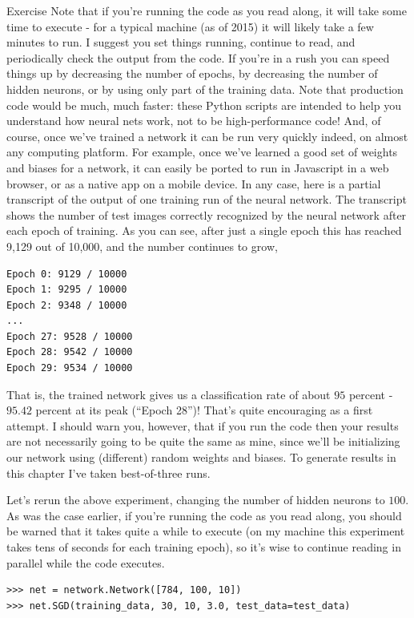 \begin{exerciseBox}{Exercise}
Note that if you're running the code as you read along, it will take some time to execute - for a typical machine (as of 2015) it will likely take a few minutes to run. I suggest you set things running, continue to read, and periodically check the output from the code. If you're in a rush you can speed things up by decreasing the number of epochs, by decreasing the number of hidden neurons, or by using only part of the training data. Note that production code would be much, much faster: these Python scripts are intended to help you understand how neural nets work, not to be high-performance code! And, of course, once we've trained a network it can be run very quickly indeed, on almost any computing platform. For example, once we've learned a good set of weights and biases for a network, it can easily be ported to run in Javascript in a web browser, or as a native app on a mobile device. In any case, here is a partial transcript of the output of one training run of the neural network. The transcript shows the number of test images correctly recognized by the neural network after each epoch of training. As you can see, after just a single epoch this has reached 9,129 out of 10,000, and the number continues to grow,



\begin{lstlisting}
Epoch 0: 9129 / 10000
Epoch 1: 9295 / 10000
Epoch 2: 9348 / 10000
...
Epoch 27: 9528 / 10000
Epoch 28: 9542 / 10000
Epoch 29: 9534 / 10000

\end{lstlisting}


That is, the trained network gives us a classification rate of about $95$ percent - $95.42$ percent at its peak (``Epoch 28'')! That's quite encouraging as a first attempt. I should warn you, however, that if you run the code then your results are not necessarily going to be quite the same as mine, since we'll be initializing our network using (different) random weights and biases. To generate results in this chapter I've taken best-of-three runs.


Let's rerun the above experiment, changing the number of hidden neurons to $100$. As was the case earlier, if you're running the code as you read along, you should be warned that it takes quite a while to execute (on my machine this experiment takes tens of seconds for each training epoch), so it's wise to continue reading in parallel while the code executes.



\begin{lstlisting}
>>> net = network.Network([784, 100, 10])
>>> net.SGD(training_data, 30, 10, 3.0, test_data=test_data)


\end{lstlisting}
\end{exerciseBox}
